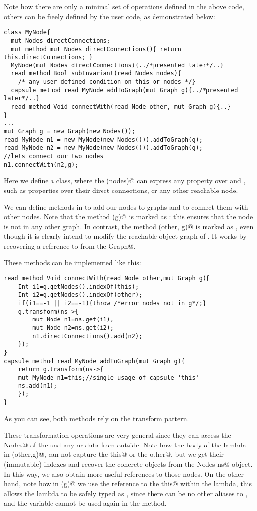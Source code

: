 Note how there are only a minimal set of operations defined in the above code, 
others can be freely defined by the user code, as demonstrated below:

\begin{lstlisting}
class MyNode{
  mut Nodes directConnections;
  mut method mut Nodes directConnections(){ return this.directConnections; }
  MyNode(mut Nodes directConnections){../*presented later*/..}
  read method Bool subInvariant(read Nodes nodes){
    /* any user defined condition on this or nodes */}  
  capsule method read MyNode addToGraph(mut Graph g){../*presented later*/..}
  read method Void connectWith(read Node other, mut Graph g){..}
}
...
mut Graph g = new Graph(new Nodes());
read MyNode n1 = new MyNode(new Nodes())).addToGraph(g);
read MyNode n2 = new MyNode(new Nodes())).addToGraph(g);
//lets connect our two nodes
n1.connectWith(n2,g);
\end{lstlisting}
Here we define a \Q@MyNode@ class, where the \Q@subInvariant(nodes)@ can express any property over \Q@this@ and \Q@nodes@, such as properties over their direct connections, or any other reachable node.

We can define methods in \Q@MyNode@ to add our nodes
to graphs and to connect them with other nodes.
Note that the method \Q@addToGraph(g)@ is marked as \Q@capsule@: this ensures that the node is not in any other graph.
In contrast, the method \Q@connectWith(other, g)@ is marked as \Q@read@, even though it is clearly intend to modify the reachable object graph of \Q@this@.
It works by recovering a \Q@mut@ reference to \Q@this@ from the \Q@mut Graph@.

These methods can be implemented like this:
\begin{lstlisting}
read method Void connectWith(read Node other,mut Graph g){
	Int i1=g.getNodes().indexOf(this);
	Int i2=g.getNodes().indexOf(other);
	if(i1==-1 || i2==-1){throw /*error nodes not in g*/;}
	g.transform(ns->{
		mut Node n1=ns.get(i1);
		mut Node n2=ns.get(i2);
		n1.directConnections().add(n2);
	});
}
capsule method read MyNode addToGraph(mut Graph g){
	return g.transform(ns->{
	mut MyNode n1=this;//single usage of capsule 'this'
	ns.add(n1);
	});
}
\end{lstlisting}
As you can see, both methods rely on the transform pattern.

These transformation operations are very general since they
can access the \Q@mut Nodes@ of the \Q@Graph@ and 
any \Q@rep@ or \Q@imm@ data from outside.
Note how the body of the \Q@capsule@ lambda in \Q@connectWith(other,g)@, can not capture the \Q@read this@ or the \Q@read other@, but we get their (immutable) indexes 
and recover the concrete objects from the \Q@mut Nodes ns@ object.
In this way, we also obtain more useful \Q@mut@ references to those nodes.
On the other hand, note how in \Q@addToGraph(g)@ we use the reference to the \Q@capsule this@ within the lambda, this allows the lambda to be safely typed as \Q@capsule@, since there can be no other aliases to \Q@this@, and the \Q@this@ variable cannot be used again in the method.